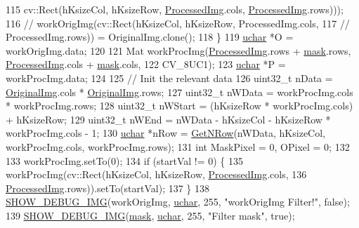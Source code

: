 \begin{DoxyCode}
115         cv::Rect(hKsizeCol, hKsizeRow, \hyperlink{class_vision_1_1_image_processing_aa7d65742882cd1b2a1e4e9cb68809211}{ProcessedImg}.cols, 
      \hyperlink{class_vision_1_1_image_processing_aa7d65742882cd1b2a1e4e9cb68809211}{ProcessedImg}.rows)));
116     \textcolor{comment}{// workOrigImg(cv::Rect(hKsizeCol, hKsizeRow, ProcessedImg.cols,}
117     \textcolor{comment}{// ProcessedImg.rows)) = OriginalImg.clone();}
118   \}
119   \hyperlink{_soil_math_types_8h_a65f85814a8290f9797005d3b28e7e5fc}{uchar} *O = workOrigImg.data;
120 
121   Mat workProcImg(\hyperlink{class_vision_1_1_image_processing_aa7d65742882cd1b2a1e4e9cb68809211}{ProcessedImg}.rows + \hyperlink{_gen_blob_8m_a5d76cc2129e79ba1941d2cc2f53b9e8e}{mask}.rows, \hyperlink{class_vision_1_1_image_processing_aa7d65742882cd1b2a1e4e9cb68809211}{ProcessedImg}.cols + 
      \hyperlink{_gen_blob_8m_a5d76cc2129e79ba1941d2cc2f53b9e8e}{mask}.cols,
122                   CV\_8UC1);
123   \hyperlink{_soil_math_types_8h_a65f85814a8290f9797005d3b28e7e5fc}{uchar} *P = workProcImg.data;
124 
125   \textcolor{comment}{// Init the relevant data}
126   uint32\_t nData = \hyperlink{class_vision_1_1_image_processing_a77c370dab270158a4e9c634e2d3f48e7}{OriginalImg}.cols * \hyperlink{class_vision_1_1_image_processing_a77c370dab270158a4e9c634e2d3f48e7}{OriginalImg}.rows;
127   uint32\_t nWData = workProcImg.cols * workProcImg.rows;
128   uint32\_t nWStart = (hKsizeRow * workProcImg.cols) + hKsizeRow;
129   uint32\_t nWEnd = nWData - hKsizeCol - hKsizeRow * workProcImg.cols - 1;
130   \hyperlink{_soil_math_types_8h_a65f85814a8290f9797005d3b28e7e5fc}{uchar} *nRow = \hyperlink{class_vision_1_1_image_processing_a56e17515a15eb7d246985e550fc89610}{GetNRow}(nWData, hKsizeCol, workProcImg.cols, workProcImg.rows);
131   \textcolor{keywordtype}{int} MaskPixel = 0, OPixel = 0;
132 
133   workProcImg.setTo(0);
134   \textcolor{keywordflow}{if} (startVal != 0) \{
135     workProcImg(cv::Rect(hKsizeCol, hKsizeRow, \hyperlink{class_vision_1_1_image_processing_aa7d65742882cd1b2a1e4e9cb68809211}{ProcessedImg}.cols,
136                          \hyperlink{class_vision_1_1_image_processing_aa7d65742882cd1b2a1e4e9cb68809211}{ProcessedImg}.rows)).setTo(startVal);
137   \}
138   \hyperlink{_vision_debug_8h_aae864fa4f990213a4184a209ff236202}{SHOW\_DEBUG\_IMG}(workOrigImg, \hyperlink{_soil_math_types_8h_a65f85814a8290f9797005d3b28e7e5fc}{uchar}, 255, \textcolor{stringliteral}{"workOrigImg Filter!"}, \textcolor{keyword}{false});
139   \hyperlink{_vision_debug_8h_aae864fa4f990213a4184a209ff236202}{SHOW\_DEBUG\_IMG}(\hyperlink{_gen_blob_8m_a5d76cc2129e79ba1941d2cc2f53b9e8e}{mask}, \hyperlink{_soil_math_types_8h_a65f85814a8290f9797005d3b28e7e5fc}{uchar}, 255, \textcolor{stringliteral}{"Filter mask"}, \textcolor{keyword}{true});

\end{DoxyCode}

